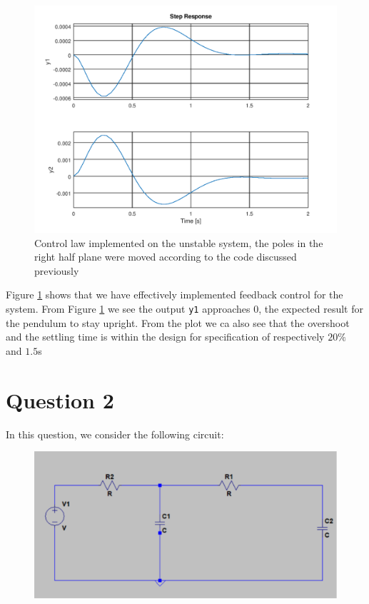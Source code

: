 \documentclass[a4paper, 12pt]{article}
\begin{document}
\begin{figure}[H]
  \centering
  \includegraphics[width=\textwidth]{images/control.png}
  \caption{Control law implemented on the unstable system, the poles in the right half plane were moved according to the code discussed previously}
  \label{fig:control}
\end{figure}

Figure \ref{fig:control} shows that we have effectively implemented feedback control for the system. From Figure \ref{fig:control} we see the output \texttt{y1} approaches $0$, the expected result for the pendulum to stay upright. From the plot we ca also see that the overshoot and the settling time is within the design for specification of respectively $20\%$ and $1.5$s





\section{Question 2}

In this question, we consider the following circuit:

\begin{figure}[H]
  \centering
  \includegraphics[width=.8\textwidth]{./images/circuit.png}
  \caption{}
  \label{fig:circuit}
\end{figure}
\end{document}
